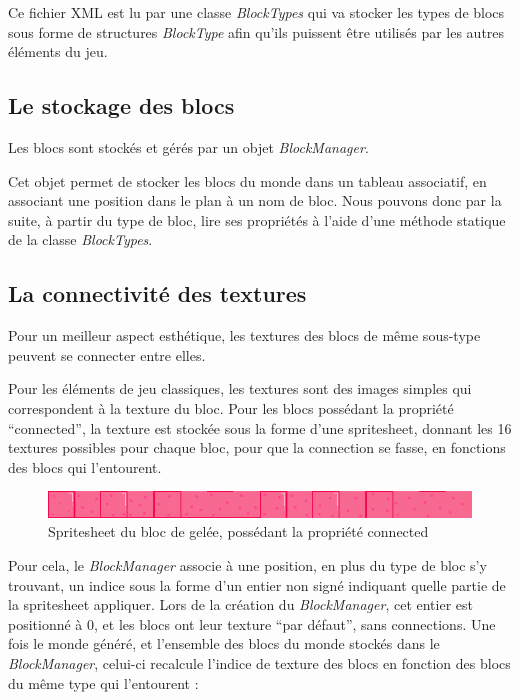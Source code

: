 \documentclass[10pt]{report}
\begin{document}
Ce fichier XML est lu par une classe \emph{BlockTypes} qui va stocker les types de blocs sous forme de structures \emph{BlockType} afin qu'ils puissent être utilisés par les autres éléments du jeu.
  
\subsection{Le stockage des blocs}

Les blocs sont stockés et gérés par un objet \emph{BlockManager}.

Cet objet permet de stocker les blocs du monde dans un tableau associatif, en associant une position dans le plan à un nom de bloc.
Nous pouvons donc par la suite, à partir du type de bloc, lire ses propriétés à l'aide d'une méthode statique de la classe \emph{BlockTypes}.

\subsection{La connectivité des textures}

Pour un meilleur aspect esthétique, les textures des blocs de même sous-type peuvent se connecter entre elles.

Pour les éléments de jeu classiques, les textures sont des images simples qui correspondent à la texture du bloc.
Pour les blocs possédant la propriété ``connected'', la texture est stockée sous la forme d'une spritesheet,
donnant les 16 textures possibles pour chaque bloc, pour que la connection se fasse, en fonctions des blocs qui l'entourent.

\begin{figure}[H]
  \centering
  \includegraphics[width=1.0\textwidth]{images/tile_jelly}
  \caption{Spritesheet du bloc de gelée, possédant la propriété connected}
  \label{fig:tile_jelly}
\end{figure}

Pour cela, le \emph{BlockManager} associe à une position, en plus du type de bloc s'y trouvant, un indice sous la
forme d'un entier non signé indiquant quelle partie de la spritesheet appliquer.
Lors de la création du \emph{BlockManager}, cet entier est positionné à 0, et les blocs ont leur texture ``par défaut'', sans connections.
Une fois le monde généré, et l'ensemble des blocs du monde stockés dans le \emph{BlockManager}, celui-ci recalcule l'indice de texture des blocs en fonction des blocs du même type qui l'entourent :
\end{document}
